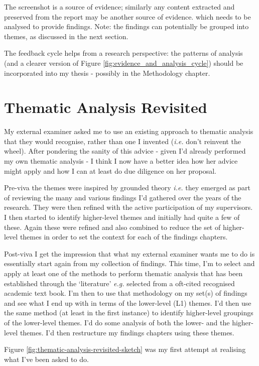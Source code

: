 The screenshot is a source of evidence; similarly any content extracted and preserved from the report may be another source of evidence. which needs to be analysed to provide findings. Note: the findings can potentially be grouped into themes, as discussed in the next section. 

The feedback cycle helps from a research perspective: the patterns of analysis (and a clearer version of Figure \ref{fig:evidence_and_analysis_cycle}) should be incorporated into my thesis - possibly in the Methodology chapter.


\section{Thematic Analysis Revisited}
My external examiner asked me to use an existing approach to thematic analysis that they would recognise, rather than one I invented (\emph{i.e.} don't reinvent the wheel). After pondering the sanity of this advice - given I'd already performed my own thematic analysis - I think I now have a better idea how her advice might apply and how I can at least do due diligence on her proposal. 

Pre-viva the themes were inspired by grounded theory \emph{i.e.} they emerged as part of reviewing the many and various findings I'd gathered over the years of the research. They were then refined with the active participation of my supervisors. I then started to identify higher-level themes and initially had quite a few of these. Again these were refined and also combined to reduce the set of higher-level themes in order to set the context for each of the findings chapters.

Post-viva I get the impression that what my external examiner wants me to do is essentially start again from my collection of findings. This time, I'm to select and apply at least one of the methods to perform thematic analysis that has been established through the `literature' \emph{e.g.} selected from a oft-cited recognised academic text book. I'm then to use that methodology on my set(s) of findings and see what I end up with in terms of the lower-level (L1) themes. I'd then use the same method (at least in the first instance) to identify higher-level groupings of the lower-level themes. I'd do some analysis of both the lower- and the higher- level themes. I'd then restructure my findings chapters using these themes.

Figure \ref{fig:thematic-analysis-revisited-sketch} was my first attempt at realising what I've been asked to do.

